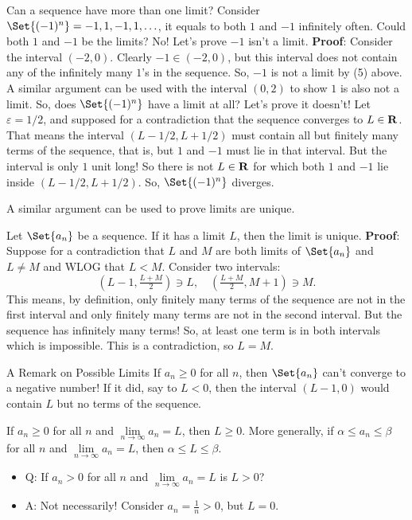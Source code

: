 \begin{Example}{}{}
    Can a sequence have more than one limit?
    Consider $ \Set{(-1)^n}=-1,1,-1,1,\ldots $, it equals to both $ 1 $ and $ -1 $ infinitely often. Could both $ 1 $ and $ -1 $
    be the limits? No! Let's prove $ -1 $ isn't a limit.
    \tcblower{}
    \textbf{Proof}: Consider the interval $ (-2,0) $. Clearly $ -1\in(-2,0) $, but
    this interval does not contain any of the infinitely many $ 1 $'s in the sequence. So, $ -1 $
    is not a limit by (5) above. A similar argument can be used with the interval $ (0,2) $ to show
    $ 1 $ is also not a limit. So, does $ \Set{(-1)^n} $ have a limit at all? Let's prove it doesn't!
    Let $ \varepsilon=1/2 $, and supposed for a contradiction that the sequence converges to $ L\in\mathbf{R} $. That means
    the interval $ (L-1/2,L+1/2) $ must contain all but finitely many terms of the sequence, that is, but $ 1 $ and $ -1 $
    must lie in that interval. But the interval is only $ 1 $ unit long! So there is not $ L\in\mathbf{R} $ for which both $ 1 $ and $ -1 $
    lie inside $ (L-1/2,L+1/2) $. So, $ \Set{(-1)^n} $ diverges.
\end{Example}
A similar argument can be used to prove limits are unique.
\begin{Theorem}{}{}
    Let $ \Set{a_n} $ be a sequence. If it has a limit $ L $, then the limit is unique.
    \tcblower{}
    \textbf{Proof}: Suppose for a contradiction that $ L $ and $ M $
    are both limits of $ \Set{a_n} $ and $ L\ne M $ and WLOG that $ L<M $. Consider two intervals:
    \[ (L-1,\tfrac{L+M}{2})\ni L,\quad (\tfrac{L+M}{2},M+1)\ni M. \]
    This means, by definition, only finitely many terms of the sequence are not in the first interval and only finitely
    many terms are not in the second interval. But the sequence has infinitely many terms! So, at least one term is in both intervals
    which is impossible. This is a contradiction, so $ L=M $.
\end{Theorem}
\begin{Remark}{A Remark on Possible Limits}{}
    If $ a_n\ge 0 $ for all $ n $, then $ \Set{a_n} $ can't converge to a negative number! If it did, say to $ L<0 $,
    then the interval $ (L-1,0) $ would contain $ L $ but no terms of the sequence.
\end{Remark}
\begin{Theorem}{}{}
    If $ a_n\ge 0 $ for all $ n $ and $ \lim\limits_{{n} \to {\infty}}a_n=L $, then $ L\ge 0 $.
    More generally, if $ \alpha\le a_n\le \beta $ for all $ n $ and $ \lim\limits_{{n} \to {\infty}}a_n=L $,
    then $ \alpha\le L\le \beta $.
\end{Theorem}
\begin{itemize}
    \item Q\@: If $ a_n>0 $ for all $ n $ and $ \lim\limits_{{n} \to {\infty}}a_n=L $ is $ L>0 $?
    \item A\@: Not necessarily! Consider $ a_n=\frac{1}{n}>0 $, but $ L=0 $.
\end{itemize}
